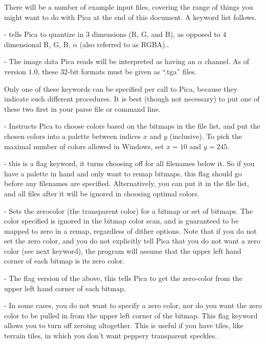 \newpar There will be a number of example input files, covering the range of things
you might want to do with Pica at the end of this document. A keyword list follows.

 - tells Pica to quantize in $3$ dimensions (R, G, and B), 
as opposed to $4$ dimensional R, G, B, $\alpha$ (also referred to as RGBA)..

 - The image data Pica reads will be interpreted as having
an $\alpha$ channel. As of version $1.0$, these $32$-bit formats must be given as
``.tga'' files.

\newpar Only one of these keywords can be specified per call to Pica, because they
indicate such different procedures. It is best (though not necessary) to put one of
these two first in your parse file or command line.

 - Instructs Pica to choose colors based on the bitmaps in the
file list, and put the chosen colors into a palette between indices $x$ and $y$
(inclusive). To pick the maximal number of colors allowed in Windows, set $x=10$ and
$y=245$.

 - this is a flag keyword, it turns choosing off for all filenames
below it. So if you have a palette in hand and only want to remap bitmaps, this 
flag should go before any filenames are specified. Alternatively, you can put it in 
the file list, and all files after it will be ignored in choosing optimal colors. 

 - Sets the zerocolor (the transparent color) for
a bitmap or set of bitmaps. The color specified is ignored in the bitmap color scan,
and is guaranteed to be mapped to zero in a remap, regardless of dither options. Note that
if you do not set the zero color, and you do not explicitly tell Pica that you do not
want a zero color (see next keyword), the program will assume that the upper left hand
corner of each bitmap is its zero color.

 - The flag version of the above, this tells Pica to get the
zero-color from the upper left hand corner of each bitmap.

 - In some cases, you do not want to specify a zero color, nor
do you want the zero color to be pulled in from the upper left corner of the bitmap. This
flag keyword allows you to turn off zeroing altogether. This is useful if you have
tiles, like terrain tiles, in which you don't want peppery transparent speckles. 

